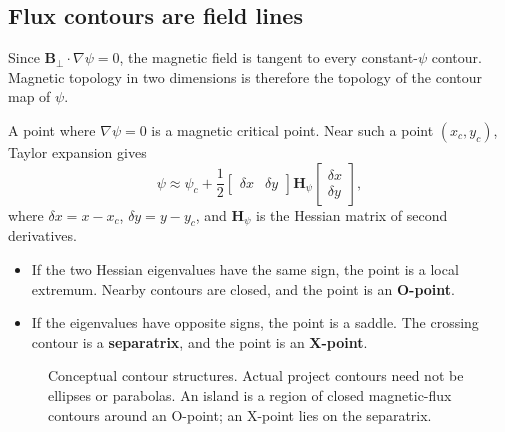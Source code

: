\documentclass[11pt]{article}
\newcommand{\vect}[1]{\bm{#1}}
\begin{document}
\subsection{Flux contours are field lines}

Since $\vect{B}_\perp\cdot\nabla\psi=0$, the magnetic field is tangent to every constant-$\psi$ contour. Magnetic topology in two dimensions is therefore the topology of the contour map of $\psi$.

A point where $\nabla\psi=0$ is a magnetic critical point. Near such a point $(x_c,y_c)$, Taylor expansion gives
\begin{equation}
\psi\approx\psi_c+\frac{1}{2}
\begin{bmatrix}\delta x&\delta y\end{bmatrix}
\vect{H}_\psi
\begin{bmatrix}\delta x\\\delta y\end{bmatrix},
\end{equation}
where $\delta x=x-x_c$, $\delta y=y-y_c$, and $\vect{H}_\psi$ is the Hessian matrix of second derivatives.

\begin{itemize}
  \item If the two Hessian eigenvalues have the same sign, the point is a local extremum. Nearby contours are closed, and the point is an \textbf{O-point}.
  \item If the eigenvalues have opposite signs, the point is a saddle. The crossing contour is a \textbf{separatrix}, and the point is an \textbf{X-point}.
\end{itemize}

\begin{figure}[htbp]
\centering
{}
\caption{Conceptual contour structures. Actual project contours need not be ellipses or parabolas. An island is a region of closed magnetic-flux contours around an O-point; an X-point lies on the separatrix.}
\label{fig:oxpoints}
\end{figure}
\end{document}
